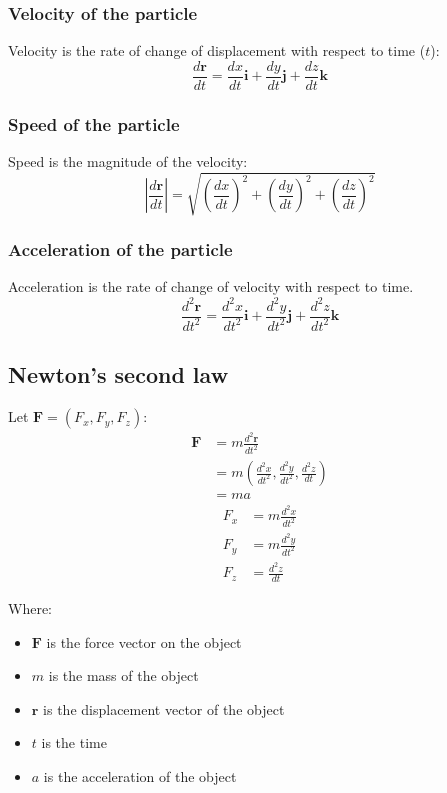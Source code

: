 \documentclass[11pt]{article}
\begin{document}
\subsubsection{Velocity of the particle}
\label{sec:orgfbc8e7b}
Velocity is the rate of change of displacement with respect to time (\(t\)):
\[\frac{d \boldsymbol{r}}{dt} = \frac{dx}{dt} \boldsymbol{i} + \frac{dy}{dt} \boldsymbol{j} + \frac{dz}{dt} \boldsymbol{k}\]

\subsubsection{Speed of the particle}
\label{sec:orgae5fde3}
Speed is the magnitude of the velocity:
\[\left| \frac{d \boldsymbol{r}}{dt} \right| = \sqrt{\left(\frac{dx}{dt} \right)^2 + \left(\frac{dy}{dt} \right)^2 + \left(\frac{dz}{dt} \right)^2}\]

\subsubsection{Acceleration of the particle}
\label{sec:orgd183267}
Acceleration is the rate of change of velocity with respect to time.
\[\frac{d^2 \boldsymbol{r}}{dt^2} = \frac{d^2 x}{dt^2} \boldsymbol{i} + \frac{d^2 y}{dt^2} \boldsymbol{j} + \frac{d^2 z}{dt^2} \boldsymbol{k}\]

 \newpage

\subsection{Newton's second law}
\label{sec:org3c22052}
Let \(\boldsymbol{F} = (F_x, F_y, F_z)\):
\begin{align*}
\boldsymbol{F} &= m \frac{d^2 \boldsymbol{r}}{dt^2} \\
&= m \left(\frac{d^2 x}{dt^2}, \frac{d^2 y}{dt^2}, \frac{d^2 z}{dt} \right) \\
&= ma
\end{align*}
\begin{align*}
F_x &= m \frac{d^2 x}{dt^2} \\
F_y &= m \frac{d^2 y}{dt^2} \\
F_z &= \frac{d^2 z}{dt}
\end{align*}

Where:
\begin{itemize}
\item \(\boldsymbol{F}\) is the force vector on the object
\item \(m\) is the mass of the object
\item \(\boldsymbol{r}\) is the displacement vector of the object
\item \(t\) is the time
\item \(a\) is the acceleration of the object
\end{itemize}
\end{document}
